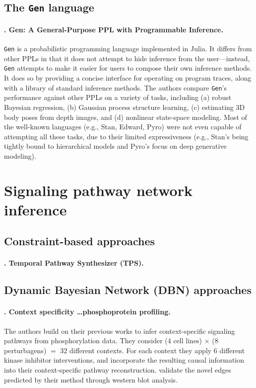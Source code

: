 \documentclass[14pt]{article}
\begin{document}
\subsection{The \texttt{Gen} language}

\paragraph{\citet{cusumano-gen-2018}. Gen: A General-Purpose PPL with Programmable Inference.}
\texttt{Gen} is a probabilistic programming language implemented in Julia.
It differs from other PPLs in that it does not attempt to hide inference from the user---instead,
\texttt{Gen} attempts to make it easier for users to compose their own inference methods.
It does so by providing a concise interface for operating on program traces, along with a library of standard inference methods.
The authors compare \texttt{Gen}'s performance against other PPLs on a variety of tasks, including (a) robust Bayesian regression, (b) Gaussian process structure learning, (c) estimating 3D body poses from depth images, and (d) nonlinear state-space modeling.
Most of the well-known languages (e.g., Stan, Edward, Pyro) were not even capable of attempting all these tasks, due to their limited expressiveness (e.g., Stan's being tightly bound to hierarchical models and Pyro's focus on deep generative modeling). 

\section{Signaling pathway network inference}

\subsection{Constraint-based approaches}

\paragraph{ \citet{2018-koksal-tps}. Temporal Pathway Synthesizer (TPS). }




\subsection{Dynamic Bayesian Network (DBN) approaches}

\paragraph{ \citet{2017-hill-context}. Context specificity \ldots phosphoprotein profiling.}
The authors build on their previous works 
\citep{2015-spencer-interventional} 
\citep{2014-oates-joint}
to infer context-specific signaling pathways from phosphorylation data.
They consider (4 cell lines) $\times$ (8 perturbagens) $=$ 32 different contexts.
For each context they apply 6 different kinase inhibitor interventions, and incorporate the resulting causal information into their context-specific pathway reconstruction.
\citeauthor{2017-hill-context} validate the novel edges predicted by their method through western blot analysis.
\end{document}
